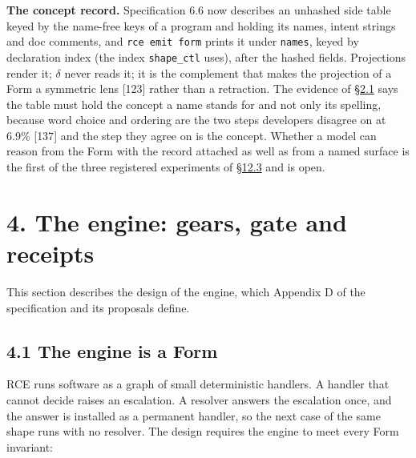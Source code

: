 \documentclass[10pt,letterpaper]{article}
\begin{document}
\textbf{The concept record.} Specification 6.6 now describes an unhashed
side table keyed by the name-free keys of a program and holding its
names, intent strings and doc comments, and \texttt{rce\ emit\ form}
prints it under \texttt{names}, keyed by declaration index (the index
\texttt{shape\_ctl} uses), after the hashed fields. Projections render
it; \(\delta\) never reads it; it is the complement that makes the
projection of a Form a symmetric lens {[}123{]} rather than a
retraction. The evidence of
\href{https://research.openie.dev/papers/rce/\#21-programming-is-coding-theory}{§2.1}
says the table must hold the concept a name stands for and not only its
spelling, because word choice and ordering are the two steps developers
disagree on at 6.9\% {[}137{]} and the step they agree on is the
concept. Whether a model can reason from the Form with the record
attached as well as from a named surface is the first of the three
registered experiments of
\href{https://research.openie.dev/papers/rce/\#123-why-human-written-code-is-redundant}{§12.3}
and is open.

\section{4. The engine: gears, gate and
receipts}\label{the-engine-gears-gate-and-receipts}

This section describes the design of the engine, which Appendix D of the
specification and its proposals define.

\subsection{4.1 The engine is a Form}\label{the-engine-is-a-form}

RCE runs software as a graph of small deterministic handlers. A handler
that cannot decide raises an escalation. A resolver answers the
escalation once, and the answer is installed as a permanent handler, so
the next case of the same shape runs with no resolver. The design
requires the engine to meet every Form invariant:
\end{document}
